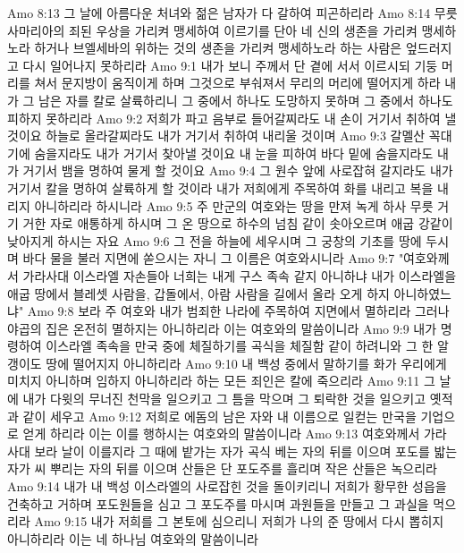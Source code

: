 Amo 8:13  그 날에 아름다운 처녀와 젊은 남자가 다 갈하여 피곤하리라
Amo 8:14  무릇 사마리아의 죄된 우상을 가리켜 맹세하여 이르기를 단아 네 신의 생존을 가리켜 맹세하노라 하거나 브엘세바의 위하는 것의 생존을 가리켜 맹세하노라 하는 사람은 엎드러지고 다시 일어나지 못하리라
Amo 9:1  내가 보니 주께서 단 곁에 서서 이르시되 기둥 머리를 쳐서 문지방이 움직이게 하며 그것으로 부숴져서 무리의 머리에 떨어지게 하라 내가 그 남은 자를 칼로 살륙하리니 그 중에서 하나도 도망하지 못하며 그 중에서 하나도 피하지 못하리라
Amo 9:2  저희가 파고 음부로 들어갈찌라도 내 손이 거기서 취하여 낼 것이요 하늘로 올라갈찌라도 내가 거기서 취하여 내리울 것이며
Amo 9:3  갈멜산 꼭대기에 숨을지라도 내가 거기서 찾아낼 것이요 내 눈을 피하여 바다 밑에 숨을지라도 내가 거기서 뱀을 명하여 물게 할 것이요
Amo 9:4  그 원수 앞에 사로잡혀 갈지라도 내가 거기서 칼을 명하여 살륙하게 할 것이라 내가 저희에게 주목하여 화를 내리고 복을 내리지 아니하리라 하시니라
Amo 9:5  주 만군의 여호와는 땅을 만져 녹게 하사 무릇 거기 거한 자로 애통하게 하시며 그 온 땅으로 하수의 넘침 같이 솟아오르며 애굽 강같이 낮아지게 하시는 자요
Amo 9:6  그 전을 하늘에 세우시며 그 궁창의 기초를 땅에 두시며 바다 물을 불러 지면에 쏟으시는 자니 그 이름은 여호와시니라
Amo 9:7  "여호와께서 가라사대 이스라엘 자손들아 너희는 내게 구스 족속 같지 아니하냐 내가 이스라엘을 애굽 땅에서 블레셋 사람을, 갑돌에서, 아람 사람을 길에서 올라 오게 하지 아니하였느냐"
Amo 9:8  보라 주 여호와 내가 범죄한 나라에 주목하여 지면에서 멸하리라 그러나 야곱의 집은 온전히 멸하지는 아니하리라 이는 여호와의 말씀이니라
Amo 9:9  내가 명령하여 이스라엘 족속을 만국 중에 체질하기를 곡식을 체질함 같이 하려니와 그 한 알갱이도 땅에 떨어지지 아니하리라
Amo 9:10  내 백성 중에서 말하기를 화가 우리에게 미치지 아니하며 임하지 아니하리라 하는 모든 죄인은 칼에 죽으리라
Amo 9:11  그 날에 내가 다윗의 무너진 천막을 일으키고 그 틈을 막으며 그 퇴락한 것을 일으키고 옛적과 같이 세우고
Amo 9:12  저희로 에돔의 남은 자와 내 이름으로 일컫는 만국을 기업으로 얻게 하리라 이는 이를 행하시는 여호와의 말씀이니라
Amo 9:13  여호와께서 가라사대 보라 날이 이를지라 그 때에 밭가는 자가 곡식 베는 자의 뒤를 이으며 포도를 밟는 자가 씨 뿌리는 자의 뒤를 이으며 산들은 단 포도주를 흘리며 작은 산들은 녹으리라
Amo 9:14  내가 내 백성 이스라엘의 사로잡힌 것을 돌이키리니 저희가 황무한 성읍을 건축하고 거하며 포도원들을 심고 그 포도주를 마시며 과원들을 만들고 그 과실을 먹으리라
Amo 9:15  내가 저희를 그 본토에 심으리니 저희가 나의 준 땅에서 다시 뽑히지 아니하리라 이는 네 하나님 여호와의 말씀이니라


